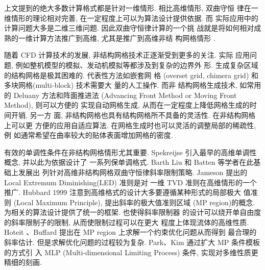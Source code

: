 上文提到的绝大多数计算格式都是针对一维情形. 相比高维情形, 双曲守恒
律在一维情形的理论相对完善, 在一定程度上可以为算法设计提供依据. 而
实际应用中的计算问题大多是二维三维问题. 因此双曲守恒律计算的一个挑
战就是将如何相对成熟的一维计算方法推广到高维, 尤其是推广到高维非结
构网格情形 \cite{Deng2012}.

随着 CFD 计算技术的发展, 非结构网格技术正逐渐受到更多的关注. 实际
应用问题, 例如整机模型的模拟、发动机模拟等都涉及到复杂的边界外
形. 生成复杂区域的结构网格是极其困难的. 代表性方法如嵌套网
格 (overset grid, chimera grid) 和多块网格(multi-block) 技术需要大
量的人工操作\cite{Venkatakrishnan1996,overset1983,Vatsa1993}. 而非
结构网格生成技术, 如常用的 Deluany 方法和阵面推进法 (Advancing
Front Method or Moving Front
Method)\cite{Anderson199423,Blazek2001,Ldhner1988}, 则可以方便的
实现自动网格生成, 从而在一定程度上降低网格生成的时间开销. 另一方
面, 非结构网格也具有结构网格所不具备的灵活性. 在非结构网格上可以更
方便的应用自适应算法. 在网格生成时也可以灵活的调整局部的稀疏性, 例
如通常希望在曲率较大的贴体表面增加网格的密度.

有效的单调性条件在非结构网格情形尤其重要. Spekreijse
\cite{spekreijse1987} 引入最早的高维单调性概念, 并以此为依据设计了
一系列保单调格式. Barth \cite{Barth1989} Liu
\cite{Liu1993} 和 Batten \cite{Batten1996} 等学者在此基础上发展出
列针对高维非结构网格双曲守恒律斜率限制策略.  Jameson
\cite{Jameson1995} 提出的 Local Extremum Diminishing(LED) 准则是对
一维 TVD 准则在高维情形的一个推广.  Hubbard 1999
\cite{Hubbard1999}注意到高维格式的设计大多要遵循某种形式的局部极大
值准则 (Local Maximum Principle), 提出斜率的极大值准则区域 (MP
region)的概念. 为相关的算法设计提供了统一的框架. 也使得斜率限制器
的设计可以绕开单自由度的斜率限制子的限制, 从而使限制过程可以在更大
程度上体现流体的高维性质. Hoteit \cite{Hoteit2004}、Buffard
\cite{Buffard2010}提出在 MP region 上求解一个约束优化问题从而得到
最合理的斜率估计. 但是求解优化问题的过程较为复杂.  Park、Kim
\cite{Park2010,Park2011,Park2014}通过扩大 MP 条件模板的方式引
入 MLP (Multi-dimensional Limiting Process) 条件, 实现对多维性质更
精细的刻画.

